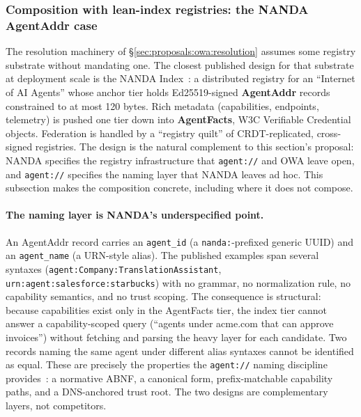 \subsubsection{Composition with lean-index registries: the NANDA AgentAddr case}
\label{sec:proposals:owa:nanda}

The resolution machinery of
\S\ref{sec:proposals:owa:resolution} assumes some
registry substrate without mandating one. The closest
published design for that substrate at deployment scale
is the NANDA Index~\cite{nanda_index}: a distributed
registry for an ``Internet of AI Agents'' whose anchor
tier holds Ed25519-signed \textbf{AgentAddr} records
constrained to at most 120 bytes. Rich metadata
(capabilities, endpoints, telemetry) is pushed one tier
down into \textbf{AgentFacts}, W3C Verifiable Credential
objects. Federation is handled by a ``registry quilt'' of
CRDT-replicated, cross-signed registries. The design is
the natural complement to this section's proposal: NANDA
specifies the registry infrastructure that
\texttt{agent://} and OWA leave open, and
\texttt{agent://} specifies the naming layer that NANDA
leaves ad hoc. This subsection makes the composition
concrete, including where it does not compose.

\paragraph{The naming layer is NANDA's underspecified point.}
An AgentAddr record carries an \texttt{agent\_id}
(a \texttt{nanda:}-prefixed generic UUID) and an
\texttt{agent\_name} (a URN-style alias). The published
examples span several syntaxes
(\texttt{agent:Company:TranslationAssistant},
\texttt{urn:agent:salesforce:starbucks}) with no grammar,
no normalization rule, no capability semantics, and no
trust scoping. The consequence is structural: because
capabilities exist only in the AgentFacts tier, the index
tier cannot answer a capability-scoped query (``agents
under acme.com that can approve invoices'') without
fetching and parsing the heavy layer for each candidate.
Two records naming the same agent under different alias
syntaxes cannot be identified as equal. These are
precisely the properties the \texttt{agent://} naming
discipline provides~\cite{agent_uri_scheme}: a normative
ABNF, a canonical form, prefix-matchable capability
paths, and a DNS-anchored trust root. The two designs are
complementary layers, not competitors.

